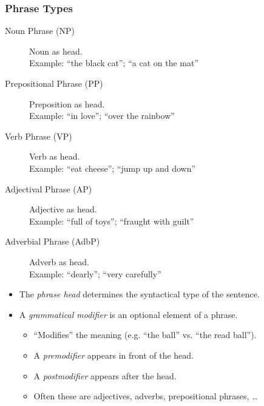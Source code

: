 \documentclass[a4paper, 11pt, accentcolor = tud3b]{tudreport}
\providecommand{\ambiguity}[1]{\textcolor{ambiguityorange}{#1}}
\begin{document}
                \subsubsection{Phrase Types} %
                	\begin{description}
                		\item[Noun Phrase (NP)] Noun as head. \\ Example: \enquote{the black \ambiguity{cat}}; \enquote{a \ambiguity{cat} on the mat}
                		\item[Prepositional Phrase (PP)] Preposition as head. \\ Example: \enquote{\ambiguity{in} love}; \enquote{\ambiguity{over} the rainbow}
                		\item[Verb Phrase (VP)] Verb as head. \\ Example: \enquote{\ambiguity{eat} cheese}; \enquote{\ambiguity{jump} up and down}
                		\item[Adjectival Phrase (AP)] Adjective as head. \\ Example: \enquote{\ambiguity{full} of toys}; \enquote{\ambiguity{fraught} with guilt}
                		\item[Adverbial Phrase (AdbP)] Adverb as head. \\ Example: \enquote{\ambiguity{dearly}}; \enquote{very \ambiguity{carefully}}
                	\end{description}
                	\begin{itemize}
                		\item The \textit{phrase head} determines the syntactical type of the sentence.
                		\item A \textit{grammatical modifier} is an optional element of a phrase.
                			\begin{itemize}
                				\item \enquote{Modifies} the meaning (e.g. \enquote{the ball} vs. \enquote{the read ball}).
                				\item A \textit{premodifier} appears in front of the head.
                				\item A \textit{postmodifier} appears after the head.
                				\item Often these are adjectives, adverbs, prepositional phrases, \dots
                			\end{itemize}
                	\end{itemize}
\end{document}
